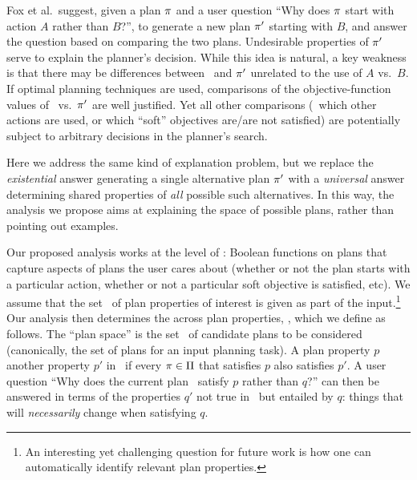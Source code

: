 Fox et al.\ suggest, given a plan $\pi$ and a user question ``Why
does $\pi$ start with action $A$ rather than $B$?'', to generate a
new plan $\pi'$ starting with $B$, and answer the question based on
comparing the two plans. Undesirable properties of $\pi'$ serve to
explain the planner's decision. While this idea is natural, a key
weakness is
%
%
%
that there may be differences between \plan\ and $\pi'$ unrelated to
the use of $A$ vs.\ $B$. If optimal planning techniques are used,
comparisons of the objective-function values of \plan\ vs.\ $\pi'$
are well justified. Yet all other comparisons (\eg\ which other
actions are used, or which ``soft'' objectives are/are not satisfied)
are potentially subject to arbitrary decisions in the planner's
search.

Here we address the same kind of explanation problem, but we replace
the \emph{existential} answer generating a single alternative plan
$\pi'$ with a \emph{universal} answer determining shared properties
of \emph{all} possible such alternatives. In this way, the analysis we
propose aims at explaining the space of possible plans, rather than
pointing out examples.

Our proposed analysis works at the level of :
Boolean functions on plans that capture aspects of plans the user
cares about (whether or not the plan starts with a particular action,
whether or not a particular soft objective is satisfied, etc). We
assume that the set \props\ of plan properties of interest is given as
part of the input.\footnote{An interesting yet challenging question
  for future work is how one can automatically identify relevant plan
  properties.} Our analysis then determines the 
across plan properties, \ie,  which we
define as follows. The ``plan space'' is the set \plans\ of candidate
plans to be considered (canonically, the set of plans for an input
planning task). A plan property $p$  another property
$p'$ in \plans\ if every $\pi \in \Pi$ that satisfies $p$ also
satisfies $p'$. A user question ``Why does the current plan
\plan\ satisfy $p$ rather than $q$?'' can then be answered in terms of
the properties $q'$ not true in \plan\ but entailed by $q$: things
that will \emph{necessarily} change when satisfying $q$.

